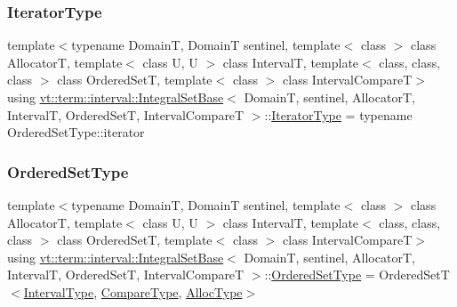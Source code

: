 \mbox{\label{structvt_1_1term_1_1interval_1_1_integral_set_base_a111b2ec1ea960a40ba4270be702f11f1}} 
\subsubsection{\texorpdfstring{Iterator\+Type}{IteratorType}}
{\footnotesize\ttfamily template$<$typename DomainT, DomainT sentinel, template$<$ class $>$ class AllocatorT, template$<$ class U, U $>$ class IntervalT, template$<$ class, class, class $>$ class Ordered\+SetT, template$<$ class $>$ class Interval\+CompareT$>$ \\
using \hyperlink{structvt_1_1term_1_1interval_1_1_integral_set_base}{vt\+::term\+::interval\+::\+Integral\+Set\+Base}$<$ DomainT, sentinel, AllocatorT, IntervalT, Ordered\+SetT, Interval\+CompareT $>$\+::\hyperlink{structvt_1_1term_1_1interval_1_1_integral_set_base_a111b2ec1ea960a40ba4270be702f11f1}{Iterator\+Type} =  typename Ordered\+Set\+Type\+::iterator}

\mbox{\label{structvt_1_1term_1_1interval_1_1_integral_set_base_af29bc3750493c7de4043f43ef7eb2ca2}} 
\subsubsection{\texorpdfstring{Ordered\+Set\+Type}{OrderedSetType}}
{\footnotesize\ttfamily template$<$typename DomainT, DomainT sentinel, template$<$ class $>$ class AllocatorT, template$<$ class U, U $>$ class IntervalT, template$<$ class, class, class $>$ class Ordered\+SetT, template$<$ class $>$ class Interval\+CompareT$>$ \\
using \hyperlink{structvt_1_1term_1_1interval_1_1_integral_set_base}{vt\+::term\+::interval\+::\+Integral\+Set\+Base}$<$ DomainT, sentinel, AllocatorT, IntervalT, Ordered\+SetT, Interval\+CompareT $>$\+::\hyperlink{structvt_1_1term_1_1interval_1_1_integral_set_base_af29bc3750493c7de4043f43ef7eb2ca2}{Ordered\+Set\+Type} =  Ordered\+SetT$<$\hyperlink{structvt_1_1term_1_1interval_1_1_integral_set_base_a1f8f5bb84064be35bbaaf15bb5a43f14}{Interval\+Type}, \hyperlink{structvt_1_1term_1_1interval_1_1_integral_set_base_a8788c1d68e2b4348c341c120363c95e7}{Compare\+Type}, \hyperlink{structvt_1_1term_1_1interval_1_1_integral_set_base_af699b4961903ebe28d478088eae9b60a}{Alloc\+Type}$>$}

